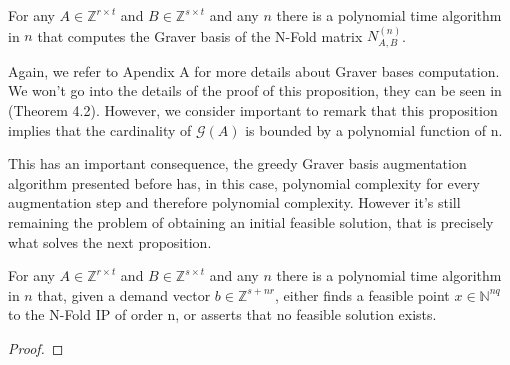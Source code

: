 
\begin{proposition}
For any $A \in \mathbb{Z}^{r \times t}$ and $B \in \mathbb{Z}^{s \times t}$ and any $n$ there is a polynomial time algorithm in $n$ that computes the Graver basis of the N-Fold matrix $N_{A,B}^{(n)}$. 
\end{proposition}
\vspace{-10pt}

Again, we refer to Apendix A for more details about Graver bases computation. We won't go into the details of the proof of this proposition, they can be seen in \cite{LHOW:2006} (Theorem 4.2). However, we consider important to remark that this proposition implies that the cardinality of $\mathcal{G}(A)$ is bounded by a polynomial function of n.

This has an important consequence, the greedy Graver basis augmentation algorithm presented before has, in this case, polynomial complexity for every augmentation step and therefore polynomial complexity. However it's still remaining the problem of obtaining an initial feasible solution, that is precisely what solves the next proposition.


\begin{proposition}
For any $A \in \mathbb{Z}^{r \times t}$ and $B \in \mathbb{Z}^{s \times t}$ and any $n$ there is a polynomial time algorithm in $n$ that, given a  demand vector $b \in \mathbb{Z}^{s + nr}$, either finds a feasible point $x \in \mathbb{N}^{nq}$ to the N-Fold IP of order n, or asserts that no feasible solution exists.
\end{proposition}
\vspace{-20pt}
\begin{proof}
\end{proof}

